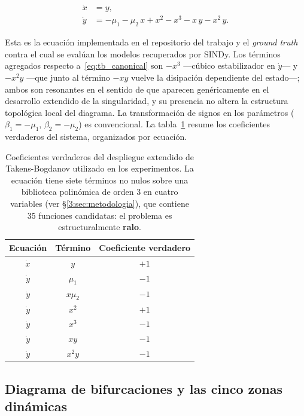\begin{equation}
\boxed{
\begin{aligned}
\dot{x} &= y, \\
\dot{y} &= -\mu_1 - \mu_2\, x + x^2 - x^3 - x\, y - x^2\, y.
\end{aligned}
}
\tag{3.3}
\label{eq:tb_extendida}
\end{equation}

Esta es la ecuación implementada en el repositorio del trabajo y el \textit{ground truth} contra el cual se evalúan los modelos recuperados por SINDy. Los términos agregados respecto a~\eqref{eq:tb_canonical} son $-x^3$ —cúbico estabilizador en $\dot{y}$— y $-x^2 y$ —que junto al término $-xy$ vuelve la disipación dependiente del estado—; ambos son resonantes en el sentido de que aparecen genéricamente en el desarrollo extendido de la singularidad, y su presencia no altera la estructura topológica local del diagrama. La transformación de signos en los parámetros ($\beta_1 = -\mu_1$, $\beta_2 = -\mu_2$) es convencional. La tabla~\ref{tab:tb_coeffs} resume los coeficientes verdaderos del sistema, organizados por ecuación.

\begin{table}[h]
\centering
\begin{tabular}{c|c|c}
\hline
Ecuación & Término & Coeficiente verdadero \\
\hline
$\dot{x}$ & $y$       & $+1$ \\
\hline
$\dot{y}$ & $\mu_1$   & $-1$ \\
$\dot{y}$ & $x\mu_2$  & $-1$ \\
$\dot{y}$ & $x^2$     & $+1$ \\
$\dot{y}$ & $x^3$     & $-1$ \\
$\dot{y}$ & $xy$      & $-1$ \\
$\dot{y}$ & $x^2 y$   & $-1$ \\
\hline
\end{tabular}
\caption{Coeficientes verdaderos del despliegue extendido de Takens-Bogdanov utilizado en los experimentos. La ecuación tiene siete términos no nulos sobre una biblioteca polinómica de orden 3 en cuatro variables (ver §\ref{3:sec:metodologia}), que contiene 35 funciones candidatas: el problema es estructuralmente \textbf{ralo}.}
\label{tab:tb_coeffs}
\end{table}

\subsection{Diagrama de bifurcaciones y las cinco zonas dinámicas}

